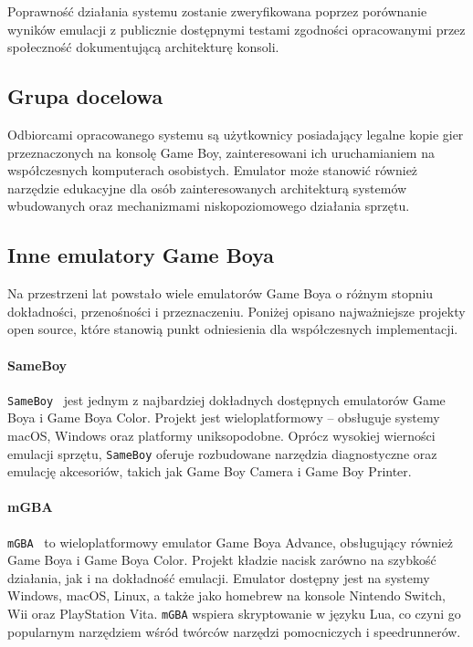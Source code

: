 \documentclass{article}
\begin{document}
Poprawność działania systemu zostanie zweryfikowana poprzez porównanie wyników emulacji z publicznie dostępnymi testami zgodności opracowanymi przez społeczność dokumentującą architekturę konsoli.
%
\subsection{Grupa docelowa}

Odbiorcami opracowanego systemu są użytkownicy posiadający legalne kopie gier przeznaczonych na konsolę Game Boy, zainteresowani ich uruchamianiem na współczesnych komputerach osobistych. Emulator może stanowić również narzędzie edukacyjne dla osób zainteresowanych architekturą systemów wbudowanych oraz mechanizmami niskopoziomowego działania sprzętu.

\subsection{Inne emulatory Game Boya}

Na przestrzeni lat powstało wiele emulatorów Game Boya o różnym stopniu
dokładności, przenośności i przeznaczeniu. Poniżej opisano najważniejsze
projekty open source, które stanowią punkt odniesienia dla współczesnych
implementacji.

\paragraph{SameBoy}
\texttt{SameBoy}~\cite{sameboy} jest jednym z najbardziej dokładnych
dostępnych emulatorów Game Boya i Game Boya Color. Projekt jest
wieloplatformowy -- obsługuje systemy macOS, Windows oraz platformy
uniksopodobne. Oprócz wysokiej wierności emulacji sprzętu, \texttt{SameBoy}
oferuje rozbudowane narzędzia diagnostyczne oraz emulację akcesoriów,
takich jak Game Boy Camera i Game Boy Printer.

\paragraph{mGBA}
\texttt{mGBA}~\cite{mgba} to wieloplatformowy emulator Game Boya Advance,
obsługujący również Game Boya i Game Boya Color. Projekt kładzie nacisk
zarówno na szybkość działania, jak i na dokładność emulacji. Emulator
dostępny jest na systemy Windows, macOS, Linux, a także jako homebrew na
konsole Nintendo Switch, Wii oraz PlayStation Vita. \texttt{mGBA} wspiera
skryptowanie w języku Lua, co czyni go popularnym narzędziem wśród
twórców narzędzi pomocniczych i speedrunnerów.
\end{document}
